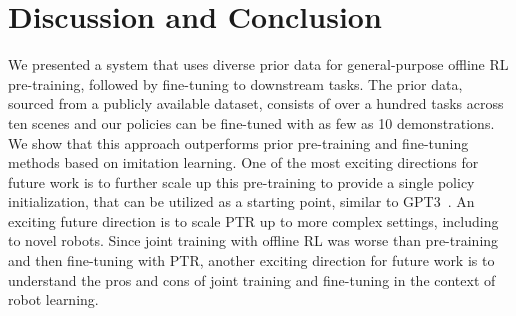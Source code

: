 \documentclass[conference]{IEEEtran}
\begin{document}
\vspace{0.1cm}
\section{Discussion and Conclusion}
\label{sec:conclusion}
\vspace{0.1cm}
We presented a system that uses diverse prior data for general-purpose offline RL pre-training, followed by fine-tuning to downstream tasks. The prior data, sourced from a publicly available dataset, consists of over a hundred tasks across ten scenes and our policies can be fine-tuned with as few as 10 demonstrations. We show that this approach outperforms prior pre-training and fine-tuning methods based on imitation learning. One of the most exciting directions for future work is to further scale up this pre-training to provide a single policy initialization, that can be utilized as a starting point, similar to GPT3~\citep{brown2020language}. 
An exciting future direction is to scale PTR up to more complex settings, including to novel robots. {Since joint training with offline RL was worse than pre-training and then fine-tuning with PTR, another exciting direction for future work is to understand the pros and cons of joint training and fine-tuning in the context of robot learning.}

\vspace{0.1cm}














\newpage
\clearpage
\appendix
\end{document}
